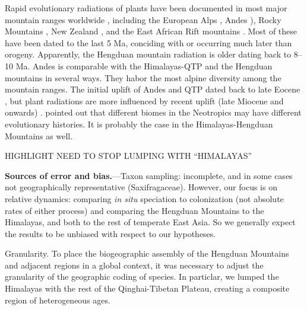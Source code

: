 


Rapid evolutionary radiations of plants have been documented in most major mountain ranges worldwide \citep[reviewed in][]{Hughes2015}, including the European Alps \citep{Roquet2013}, Andes \citep[e.g.][]{Hughes2006,Luebert2014}), Rocky Mountains \citep{DrummondC2012}, New Zealand \citep{Joly2014}, and the East African Rift mountains \citep{Linder2014}. Most of these have been dated to the last 5 Ma, conciding with or occurring much later than orogeny. Apparently, the Hengduan mountain radiation is older dating back to 8--10 Ma. Andes is comparable with the Himalayas-QTP and the Hengduan mountains in several ways. They habor the most alpine diversity among the mountain ranges. The initial uplift of Andes and QTP dated back to late Eocene \citep{Gregory-Wodzicki2000,Graham2009}, but plant radiations are more influenced by recent uplift (late Miocene and onwards) \citep{Hughes2013,Luebert2014,Hughes2015,Madrinan2013}. \citet{Hughes2013} pointed out that different biomes in the Neotropics may have different evolutionary histories. It is probably the case in the Himalayas-Hengduan Mountains as well. 

HIGHLIGHT NEED TO STOP LUMPING WITH ``HIMALAYAS''

\textbf{Sources of error and bias.}---Taxon sampling: incomplete, and in some cases not geographically representative (Saxifragaceae). However, our focus is on relative dynamics: comparing \textit{in situ} speciation to colonization (not absolute rates of either process) and comparing the Hengduan Mountains to the Himalayas, and both to the rest of temperate East Asia. So we generally expect the results to be unbiased with respect to our hypotheses.

Granularity. To place the biogeographic assembly of the Hengduan Mountains and adjacent regions in a global context, it was necessary to adjust the granularity of the geographic coding of species. In particlar, we lumped the Himalayas with the rest of the Qinghai-Tibetan Plateau, creating a composite region of heterogeneous ages.


